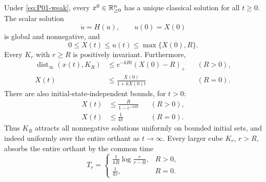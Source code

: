 \begin{theorem}
\label{thm:P01-global}
Under \eqref{eq:P01-weak}, every $x^0\in\mathbb{R}_{\geq 0}^{n}$ has a unique classical
solution for all $t\ge0$. The scalar solution
\begin{equation}
\label{eq:P01-scalar}
 \dot u=H(u),\qquad u(0)=X(0)
\end{equation}
is global and nonnegative, and
\begin{equation}
\label{eq:P01-globalbound}
 0\le X(t)\le u(t)\le\max\{X(0),R\}.
\end{equation}
Every $K_r$ with $r\ge R$ is positively invariant. Furthermore,
\begin{align}
 \operatorname{dist}_\infty(x(t),K_R)
   &\le e^{-kRt}(X(0)-R)_+ &&(R>0), \label{eq:P01-distance-rate}\\
 X(t)&\le\frac{X(0)}{1+kX(0)t} &&(R=0). \label{eq:P01-zero-rate}
\end{align}
There are also initial-state-independent bounds, for $t>0$:
\begin{align}
 X(t)&\le\frac{R}{1-e^{-kRt}} &&(R>0), \label{eq:P01-comingdown}\\
 X(t)&\le\frac1{kt} &&(R=0). \label{eq:P01-comingdown-zero}
\end{align}
Thus $K_R$ attracts all nonnegative solutions uniformly on bounded
initial sets, and indeed uniformly over the entire orthant as
$t\to\infty$. Every larger cube $K_r$, $r>R$, absorbs the entire
orthant by the common time
\begin{equation}
\label{eq:P01-outer-time}
 T_r=\begin{cases}
 \displaystyle\frac1{kR}\log\frac{r}{r-R},&R>0,\\[4pt]
 \displaystyle\frac1{kr},&R=0.
 \end{cases}
\end{equation}
\end{theorem}
